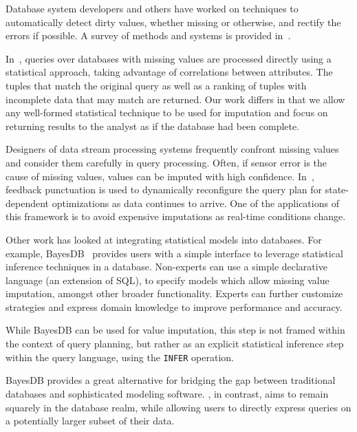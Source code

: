 Database system developers and others have worked on techniques to automatically
detect dirty values, whether missing or otherwise, and rectify the errors if
possible. A survey of methods and systems is provided in~\cite{hellerstein2008quantitative}.

In~\cite{wolf2007query}, queries over databases with missing values are
processed directly using a statistical approach, taking advantage of correlations between
attributes. The tuples that match the original query as well as a ranking of
tuples with incomplete data that may match are returned. Our work differs in
that we allow any well-formed statistical technique to be used for imputation
and focus on returning results to the analyst as if the database had been
complete.

Designers of data stream processing systems frequently confront missing values
and consider them carefully in query processing. Often, if sensor error is the
cause of missing values, values can be imputed with high confidence. In~\cite{fernandez2009inter}, feedback punctuation is used to dynamically
reconfigure the query plan for state-dependent
optimizations as data continues to arrive. One of the applications of this framework is to avoid
expensive imputations as real-time conditions change. 

Other work has looked at integrating statistical models into databases.
For example, BayesDB~\cite{mansinghka2015bayesdb} provides users with a simple interface to leverage statistical inference techniques in a database. Non-experts
can use a simple declarative language (an extension of SQL), to specify models
which allow missing value imputation, amongst other broader functionality.
Experts can further customize strategies and express domain knowledge to
improve performance and accuracy.

While BayesDB can be used for value imputation, this step is not framed
within the context of query planning, but rather as an explicit statistical
inference step within the query language, using the \verb|INFER| operation. 

BayesDB provides a great alternative for bridging the gap between
traditional databases and sophisticated modeling software. \ProjectName{}, in
contrast, aims to remain squarely in the database realm, while allowing
users to directly express queries on a potentially larger subset of their data.

